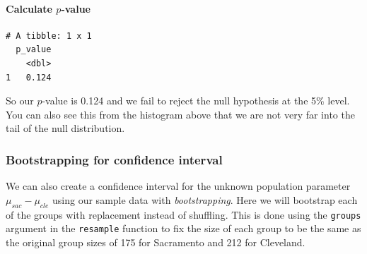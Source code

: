 \documentclass[12pt,]{krantz}
\makeatletter
\newenvironment{Shaded}{\begin{snugshade}}{\end{snugshade}}
\newcommand{\KeywordTok}[1]{\textcolor[rgb]{0.27,0.27,0.27}{\textbf{#1}}}
\newcommand{\DataTypeTok}[1]{\textcolor[rgb]{0.27,0.27,0.27}{#1}}
\newcommand{\DecValTok}[1]{\textcolor[rgb]{0.06,0.06,0.06}{#1}}
\newcommand{\StringTok}[1]{\textcolor[rgb]{0.5,0.5,0.5}{#1}}
\newcommand{\OperatorTok}[1]{\textcolor[rgb]{0.43,0.43,0.43}{\textbf{#1}}}
\newcommand{\NormalTok}[1]{#1}
\let\oldparagraph\paragraph
\renewcommand{\paragraph}[1]{\oldparagraph{#1}\mbox{}}
\newenvironment{kframe}{%
\medskip{}
\setlength{\fboxsep}{.8em}
 \def\at@end@of@kframe{}%
 \ifinner\ifhmode%
  \def\at@end@of@kframe{\end{minipage}}%
  \begin{minipage}{\columnwidth}%
 \fi\fi%
 \def\FrameCommand##1{\hskip\@totalleftmargin \hskip-\fboxsep
 \colorbox{shadecolor}{##1}\hskip-\fboxsep
     \hskip-\linewidth \hskip-\@totalleftmargin \hskip\columnwidth}%
 \MakeFramed {\advance\hsize-\width
   \@totalleftmargin\z@ \linewidth\hsize
   \@setminipage}}%
 {\par\unskip\endMakeFramed%
 \at@end@of@kframe}
\renewenvironment{Shaded}{\begin{kframe}}{\end{kframe}}
\theoremstyle{definition}
\theoremstyle{definition}
\theoremstyle{definition}
\theoremstyle{remark}
\makeatother
\begin{document}
\paragraph{\texorpdfstring{Calculate
\(p\)-value}{Calculate p-value}}\label{calculate-p-value-3}

\begin{Shaded}
\end{Shaded}

\begin{verbatim}
# A tibble: 1 x 1
  p_value
    <dbl>
1   0.124
\end{verbatim}

So our \(p\)-value is 0.124 and we fail to reject the null hypothesis at
the 5\% level. You can also see this from the histogram above that we
are not very far into the tail of the null distribution.

\subsubsection*{Bootstrapping for confidence
interval}\label{bootstrapping-for-confidence-interval-3}

We can also create a confidence interval for the unknown population
parameter \(\mu_{sac} - \mu_{cle}\) using our sample data with
\emph{bootstrapping}. Here we will bootstrap each of the groups with
replacement instead of shuffling. This is done using the \texttt{groups}
argument in the \texttt{resample} function to fix the size of each group
to be the same as the original group sizes of 175 for Sacramento and 212
for Cleveland.

\begin{Shaded}
\end{Shaded}
\end{document}
